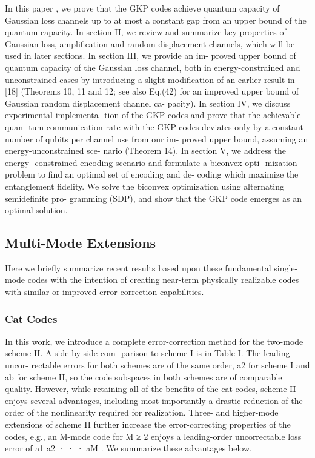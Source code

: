 \documentclass[12]{amsart}
\newcommand\0{\mathbf{0}}
\newcommand\<{\langle}
\renewcommand\>{\rangle}
\begin{document}
In this paper \cite{noh2018improved}, we prove that the GKP codes achieve quantum capacity of Gaussian loss channels up to at most a constant gap from an upper bound of the quantum capacity. In section II, we review and summarize key properties of Gaussian loss, amplification and random displacement channels, which will be used in later sections. In section III, we provide an im- proved upper bound of quantum capacity of the Gaussian loss channel, both in energy-constrained and unconstrained cases by introducing a slight modification of an earlier result in [18] (Theorems 10, 11 and 12; see also Eq.(42) for an improved upper bound of Gaussian random displacement channel ca- pacity). In section IV, we discuss experimental implementa- tion of the GKP codes and prove that the achievable quan- tum communication rate with the GKP codes deviates only by a constant number of qubits per channel use from our im- proved upper bound, assuming an energy-unconstrained sce- nario (Theorem 14). In section V, we address the energy- constrained encoding scenario and formulate a biconvex opti- mization problem to find an optimal set of encoding and de- coding which maximize the entanglement fidelity. We solve the biconvex optimization using alternating semidefinite pro- gramming (SDP), and show that the GKP code emerges as an optimal solution.
\subsection{Multi-Mode Extensions}

Here we briefly summarize recent results based upon these fundamental single-mode codes with the intention of creating near-term physically realizable codes with similar or improved error-correction capabilities.

\subsubsection{Cat Codes}\label{sec:multi-cat}

In this work, we introduce a complete error-correction method for the two-mode scheme II. A side-by-side com- parison to scheme I is in Table I. The leading uncor- rectable errors for both schemes are of the same order, a2 for scheme I and ab for scheme II, so the code subspaces in both schemes are of comparable quality. However, while retaining all of the benefits of the cat codes, scheme II enjoys several advantages, including most importantly a drastic reduction of the order of the nonlinearity required for realization. Three- and higher-mode extensions of scheme II further increase the error-correcting properties of the codes, e.g., an M-mode code for M ≥ 2 enjoys a leading-order uncorrectable loss error of a1 a2 · · · aM . We summarize these advantages below.
\end{document}
